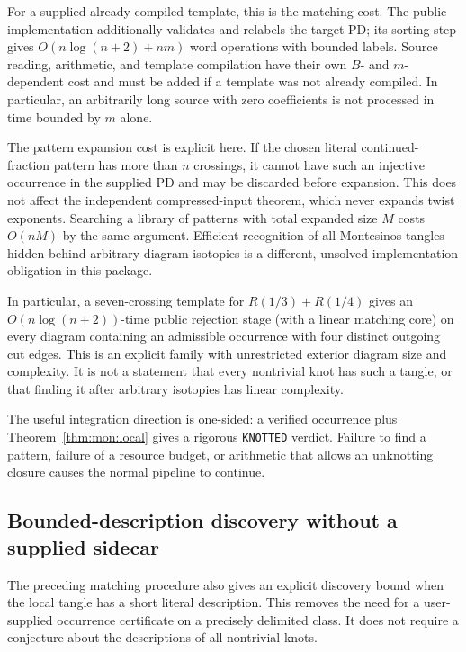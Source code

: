 \documentclass[11pt,a4paper]{article}
\theoremstyle{definition}
\theoremstyle{remark}
\numberwithin{equation}{section}
\begin{document}
For a supplied already compiled template, this is the matching cost.
The public implementation additionally validates and relabels the target PD;
its sorting step gives $O(n\log(n+2)+nm)$ word operations with bounded labels.
Source reading, arithmetic, and template compilation have their own $B$- and
$m$-dependent cost and must be added if a template was not already compiled.
In particular, an arbitrarily long source with zero coefficients is not
processed in time bounded by $m$ alone.

The pattern expansion cost is explicit here.  If the chosen literal
continued-fraction pattern has more than $n$ crossings, it cannot have such
an injective occurrence in the supplied PD and may be discarded before
expansion.  This does not affect the independent compressed-input theorem,
which never expands twist exponents.  Searching a library of patterns with
total expanded size $M$ costs $O(nM)$ by the same argument.  Efficient
recognition of all Montesinos tangles hidden behind arbitrary diagram
isotopies is a different, unsolved implementation obligation in this package.

In particular, a seven-crossing template for $R(1/3)+R(1/4)$ gives an
$O(n\log(n+2))$-time public rejection stage (with a linear matching core) on every diagram containing
an admissible occurrence with four distinct outgoing cut edges.  This is an explicit family with unrestricted
exterior diagram size and complexity.  It is not a statement that every
nontrivial knot has such a tangle, or that finding it after arbitrary isotopies
has linear complexity.

The useful integration direction is one-sided: a verified occurrence plus
Theorem~\ref{thm:mon:local} gives a rigorous \texttt{KNOTTED} verdict.
Failure to find a pattern, failure of a resource budget, or arithmetic that
allows an unknotting closure causes the normal pipeline to continue.

\subsection{Bounded-description discovery without a supplied sidecar}

The preceding matching procedure also gives an explicit discovery bound when
the local tangle has a short literal description.  This removes the need for
a user-supplied occurrence certificate on a precisely delimited class.  It
does not require a conjecture about the descriptions of all nontrivial knots.
\end{document}
